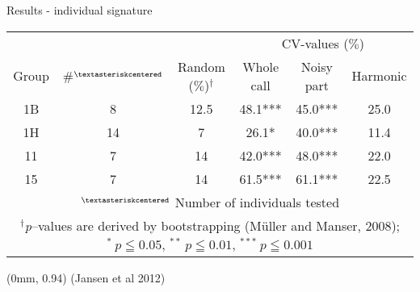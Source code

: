 \documentclass[xcolor=dvipsnames]{beamer}
\newcommand\References[1]{
\tiny{
  \begin{textblock*}{\paperwidth}(0mm, 0.94\paperheight)%
    \raggedleft (#1)\hspace{0.01\paperwidth}
  \end{textblock*}}}
\begin{document}
\begin{frame}{Results - individual signature}
\begin{table}[h]
\footnotesize{
  \begin{tabular*}{\textwidth}{@{\extracolsep{\fill}}cccccc}
  \hline
&&& \multicolumn{3}{c}{CV-values ($\%$)}\\
Group & \#$^{\textasteriskcentered}$ & Random ($\%$)$^{\dagger}$ &  Whole call  & Noisy part & Harmonic \\
\hline
1B 	& 	8 	 & 	 12.5	 & 	48.1***   & 45.0***  & 25.0 \\
1H 	& 	14  & 	7      & 	26.1*     & 40.0***  &  11.4 \\
11 	& 	7 	 & 	 14    & 	42.0***   & 48.0***  &  22.0 \\
15 	& 	7 	 & 	14     & 	61.5***   & 61.1***  &  22.5\\
\hline
\multicolumn{6}{p{0.85\textwidth}}{$^{\textasteriskcentered}$ \tiny{Number of individuals tested}} \\
\multicolumn{6}{p{0.85\textwidth}}{$^{\dagger}$\tiny{\textit{p}--values are derived by bootstrapping (M\"uller and Manser, 2008);  $^{*} \: p\leqq0.05$, $^{**} \: p\leqq0.01$, $^{***} \: p \leqq 0.001$}}
\end{tabular*}}
\end{table}

\References{Jansen et al 2012}
\end{frame}
\end{document}
